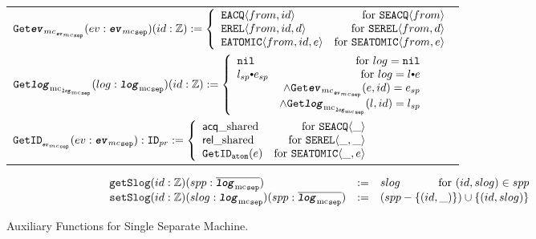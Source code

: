 \begin{figure}
\noindent{}
\begin{center}
\begin{tabular}{l}
$
   {{{\mathrm{\texttt{Get}}}{{\mathrm{\texttt{\textbf{\textit{ev}}}}}_{mc}}}_{_{{{{\mathrm{\texttt{\textbf{\textit{ev}}}}}_{mc}}_{{\mathrm{\texttt{sep}}}}}}}}(ev : {{{\mathrm{\texttt{\textbf{\textit{ev}}}}}_{mc}}_{{\mathrm{\texttt{sep}}}}}) (id : {\mathbb{Z}}) 
      :=  \left\{\begin{array}{lr}
        {{{\mathrm{\texttt{EACQ}}}}\langle{from}, {id}\rangle} & \text{for } {{{\mathrm{\texttt{SEACQ}}}}\langle{from}\rangle}\\
        {{{\mathrm{\texttt{EREL}}}}\langle{from}, {id}, {d}\rangle} & \text{for } {{{\mathrm{\texttt{SEREL}}}}\langle{from}, {d}\rangle}\\
        {{{\mathrm{\texttt{EATOMIC}}}}\langle{from}, {id}, {e}\rangle} & \text{for } {{{\mathrm{\texttt{SEATOMIC}}}}\langle{from},{e}\rangle} \\
        \end{array} \right.
$\\
$
   \separatelogtwologkwd(log : \separatelogtypekwd) (id : \ztype) 
      :=  \left\{\begin{array}{lr}
        \nulllist & \text{for } log = \nulllist \\
        \listconsoppo{e_{sp}}{l_{sp}} & \text{for }  log = \listconsoppo{e}{l} \\
        & \wedge \separateeventtwoevent{e}{id}{e_{sp}}\\
        & \wedge \separatelogtwolog{l}{id}{l_{sp}}\\
        \end{array} \right.
$\\
$
{{\mathrm{\texttt{Get}}}{\mathrm{\texttt{ID}}}_{_{{{{\mathrm{\texttt{\textbf{\textit{ev}}}}}_{mc}}_{{\mathrm{\texttt{sep}}}}}}}} (ev : {{{\mathrm{\texttt{\textbf{\textit{ev}}}}}_{mc}}_{{\mathrm{\texttt{sep}}}}}) : {{\mathrm{\texttt{ID}}}_{pr}} :=
 \left\{\begin{array}{lr}
         {\mbox{\textsf{acq}}\_\mbox{shared}}& \text{for } {{{\mathrm{\texttt{SEACQ}}}}\langle{\_}\rangle}\\
        {\mbox{\textsf{rel}}\_\mbox{shared}} & \text{for } {{{\mathrm{\texttt{SEREL}}}}\langle{\_}, {\_}\rangle}\\
        {{\mathrm{\texttt{GetID}}}_{{\mathrm{\texttt{atom}}}}({e})} & \text{for } {{{\mathrm{\texttt{SEATOMIC}}}}\langle{\_},{e}\rangle} \\
 \end{array} \right.
$\\
\end{tabular}
\end{center}
$$
\begin{array}{lll}
  \getseplogkwd (id :\ztype)(spp : \separatelogkwd)  &:= & slog \hfill{\text{for } (id, slog) \in spp}\\
   \setseplogkwd (id :\ztype) (slog : \separatelogtypekwd) (spp: \separatelogkwd) &:= &(spp - \set{(id, \_)})  \cup \set{(id, slog)}\\
\end{array}
$$
\caption{Auxiliary Functions for Single Separate Machine.}
\label{fig:chapter:conlink:auxiliary-funcitons-for-single-separate-machine}
\end{figure}

